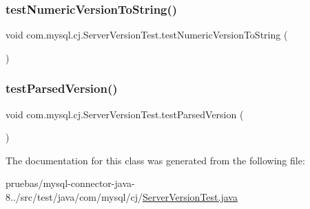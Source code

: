 \subsubsection{\texorpdfstring{test\+Numeric\+Version\+To\+String()}{testNumericVersionToString()}}
{\footnotesize\ttfamily void com.\+mysql.\+cj.\+Server\+Version\+Test.\+test\+Numeric\+Version\+To\+String (\begin{DoxyParamCaption}{ }\end{DoxyParamCaption})}

\mbox{\label{classcom_1_1mysql_1_1cj_1_1_server_version_test_a8a61c0c82091deadffbd37452e9babe5}} 
\subsubsection{\texorpdfstring{test\+Parsed\+Version()}{testParsedVersion()}}
{\footnotesize\ttfamily void com.\+mysql.\+cj.\+Server\+Version\+Test.\+test\+Parsed\+Version (\begin{DoxyParamCaption}{ }\end{DoxyParamCaption})}



The documentation for this class was generated from the following file\+:\begin{DoxyCompactItemize}
\item 
pruebas/mysql-\/connector-\/java-\/8../src/test/java/com/mysql/cj/\mbox{\hyperlink{_server_version_test_8java}{Server\+Version\+Test.\+java}}\end{DoxyCompactItemize}
